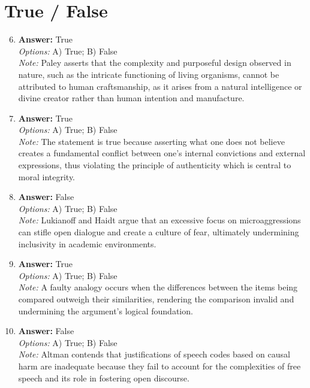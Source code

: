 \documentclass[12pt]{article}
\begin{document}
\section*{True / False}
\begin{enumerate}[label=\arabic*.]
\setcounter{enumi}{5}
\item \textbf{Answer:} True
\\ \textit{Options:} A) True; B) False
\\ \textit{Note:} Paley asserts that the complexity and purposeful design observed in nature, such as the intricate functioning of living organisms, cannot be attributed to human craftsmanship, as it arises from a natural intelligence or divine creator rather than human intention and manufacture.
\item \textbf{Answer:} True
\\ \textit{Options:} A) True; B) False
\\ \textit{Note:} The statement is true because asserting what one does not believe creates a fundamental conflict between one's internal convictions and external expressions, thus violating the principle of authenticity which is central to moral integrity.
\item \textbf{Answer:} False
\\ \textit{Options:} A) True; B) False
\\ \textit{Note:} Lukianoff and Haidt argue that an excessive focus on microaggressions can stifle open dialogue and create a culture of fear, ultimately undermining inclusivity in academic environments.
\item \textbf{Answer:} True
\\ \textit{Options:} A) True; B) False
\\ \textit{Note:} A faulty analogy occurs when the differences between the items being compared outweigh their similarities, rendering the comparison invalid and undermining the argument's logical foundation.
\item \textbf{Answer:} False
\\ \textit{Options:} A) True; B) False
\\ \textit{Note:} Altman contends that justifications of speech codes based on causal harm are inadequate because they fail to account for the complexities of free speech and its role in fostering open discourse.
\end{enumerate}
\end{document}
